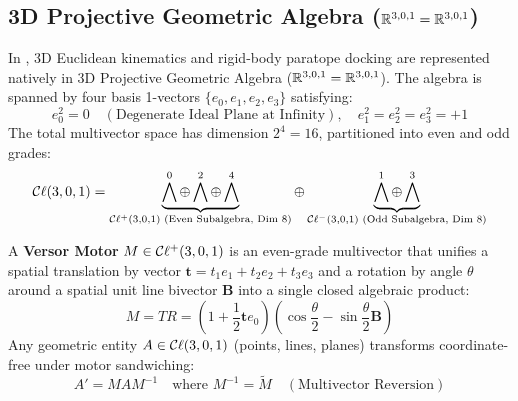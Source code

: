 \subsection{3D Projective Geometric Algebra ($\mathbb{R}^{3,0,1} = \mathbb{R}^{3,0,1}$)}
In \ToposLang{}, 3D Euclidean kinematics and rigid-body paratope docking are represented natively in 3D Projective Geometric Algebra ($\mathbb{R}^{3,0,1} = \mathbb{R}^{3,0,1}$). The algebra is spanned by four basis 1-vectors $\{e_0, e_1, e_2, e_3\}$ satisfying:
\begin{equation}
    e_0^2 = 0 \quad (\text{Degenerate Ideal Plane at Infinity}), \quad e_1^2 = e_2^2 = e_3^2 = +1
\end{equation}
The total multivector space has dimension $2^4 = 16$, partitioned into even and odd grades:
\begin{equation}
    \mathcal{C}\ell(3,0,1) = \underbrace{\bigwedge^0 \oplus \bigwedge^2 \oplus \bigwedge^4}_{\mathcal{C}\ell^+(3,0,1) \text{ (Even Subalgebra, Dim 8)}} \oplus \underbrace{\bigwedge^1 \oplus \bigwedge^3}_{\mathcal{C}\ell^-(3,0,1) \text{ (Odd Subalgebra, Dim 8)}}
\end{equation}

\begin{definition}
A \textbf{Versor Motor} $M \in \mathcal{C}\ell^+(3,0,1)$ is an even-grade multivector that unifies a spatial translation by vector $\mathbf{t} = t_1 e_1 + t_2 e_2 + t_3 e_3$ and a rotation by angle $\theta$ around a spatial unit line bivector $\mathbf{B}$ into a single closed algebraic product:
\begin{equation}
    M = T R = \left( 1 + \frac{1}{2} \mathbf{t} e_0 \right) \left( \cos\frac{\theta}{2} - \sin\frac{\theta}{2} \mathbf{B} \right)
\end{equation}
Any geometric entity $A \in \mathcal{C}\ell(3,0,1)$ (points, lines, planes) transforms coordinate-free under motor sandwiching:
\begin{equation}
    A' = M A M^{-1} \quad \text{where } M^{-1} = \widetilde{M} \quad (\text{Multivector Reversion})
\end{equation}
\end{definition}

